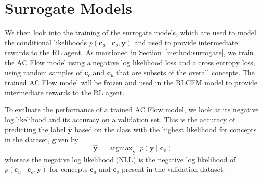 
\section{Surrogate Models}\label{eval:surrogate}

We then look into the training of the 
surrogate models, which are used to model the conditional
likelihoods $p(\mathbf{c}_u \mid \mathbf{c}_o, \mathbf{y})$ and used 
to provide intermediate rewards to the RL agent.
As mentioned in Section~\ref{method:surrogate}, 
we train the AC Flow model
using a negative log likelihood loss and a cross
entropy loss, using random samples of $\mathbf{c}_o$ and 
$\mathbf{c}_u$ that are subsets of the overall concepts.
The trained AC Flow model
will be frozen and used in the RLCEM model
to provide intermediate rewards to the RL agent.

To evaluate the performance of a trained 
AC Flow model, we look at 
its negative log likelihood and its accuracy on a validation set.
This is the accuracy of predicting 
the label $\hat{\mathbf{y}}$ 
based on the class with the highest likelihood for 
concepts in the dataset, 
given by
\[\hat{\mathbf{y}} = \mathrm{\mathop{argmax}}_{\mathbf{y}} \;
p( \mathbf{y} \mid \mathbf{c}_o)\]
whereas the negative log likelihood (NLL) is the 
negative log likelihood of 
$p(\mathbf{c}_u \mid \mathbf{c}_o, \mathbf{y})$
for concepts $\mathbf{c}_u$ and $\mathbf{c}_o$ 
present in the validation dataset.

